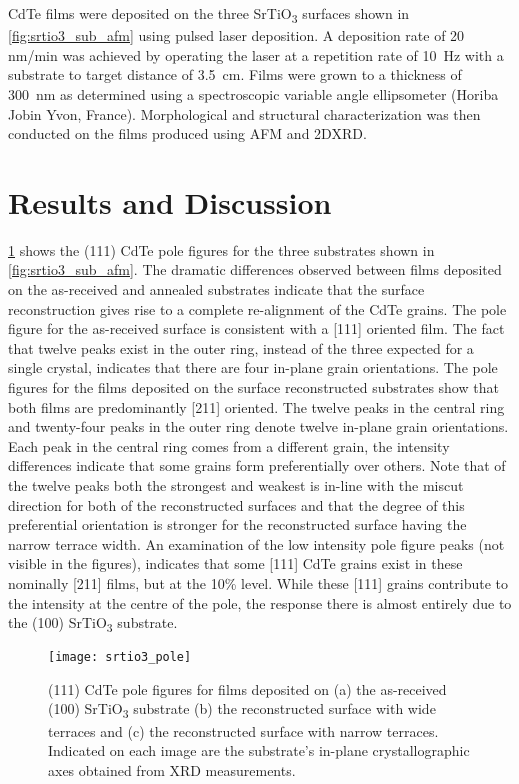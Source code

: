 CdTe films were deposited on the three SrTiO\textsubscript{3} surfaces shown in \cref{fig:srtio3_sub_afm} using pulsed laser deposition.
A deposition rate of 20 nm/min was achieved by operating the laser at a repetition rate of 10~Hz with a substrate to target distance of 3.5~cm.
Films were grown to a thickness of 300~nm as determined using a spectroscopic variable angle ellipsometer (Horiba Jobin Yvon, France).
Morphological and structural characterization was then conducted on the films produced using AFM and 2DXRD.
\section{Results and Discussion}
\cref{fig:srtio3_pole} shows the (111) CdTe pole figures for the three substrates shown in \cref{fig:srtio3_sub_afm}.
The dramatic differences observed between films deposited on the as-received and annealed substrates indicate that the surface reconstruction gives rise to a complete re-alignment of the CdTe grains.
The pole figure for the as-received surface is consistent with a [111] oriented film.
The fact that twelve peaks exist in the outer ring, instead of the three expected for a single crystal, indicates that there are four in-plane grain orientations.
The pole figures for the films deposited on the surface reconstructed substrates show that both films are predominantly [211] oriented.
The twelve peaks in the central ring and twenty-four peaks in the outer ring denote twelve in-plane grain orientations.
Each peak in the central ring comes from a different grain, the intensity differences indicate that some grains form preferentially over others.
Note that of the twelve peaks both the strongest and weakest is in-line with the miscut direction for both of the reconstructed surfaces and that the degree of this preferential orientation is stronger for the reconstructed surface having the narrow terrace width.
An examination of the low intensity pole figure peaks (not visible in the figures), indicates that some [111] CdTe grains exist in these nominally [211] films, but at the 10\% level.
While these [111] grains contribute to
the intensity at the centre of the pole, the response there is almost entirely due to the (100) SrTiO\textsubscript{3} substrate.
\begin{figure}
 \centering \texttt{[image: srtio3\_pole]}
 \caption[Pole figures of CdTe grown on SrTiO\textsubscript{3}]{\label{fig:srtio3_pole}(111) CdTe pole figures for films deposited on (a) the as-received (100) SrTiO\textsubscript{3} substrate (b) the reconstructed surface with wide terraces and (c) the reconstructed surface with narrow terraces.
  Indicated on each image are the substrate’s in-plane crystallographic axes obtained from XRD measurements.}
\end{figure}
